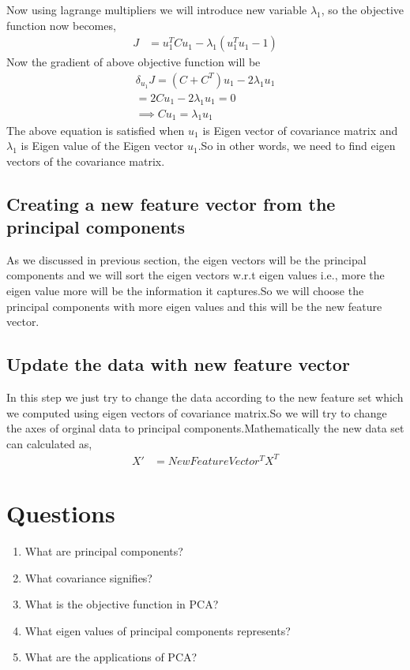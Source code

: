 \documentclass[journal,12pt,onecolumn]{IEEEtran}
\providecommand{\brak}[1]{\ensuremath{\left(#1\right)}}
\theoremstyle{remark}
\numberwithin{equation}{section}
\begin{document}
          Now using lagrange multipliers we will introduce  new variable $\lambda_1$, so the objective function now becomes,
           \begin{align}
		   J &=  u_1^TCu_1 - \lambda_1\brak{u_1^Tu_1 - 1}
           \end{align}
	  Now the gradient of above objective function will be 
	   \begin{align}
		   \delta_{u_1}J = \brak{C + C^T}u_1 - 2\lambda_1u_1\\
		                 = 2Cu_1 - 2\lambda_1 u_1 = 0\\
		   \implies Cu_1 = \lambda_1 u_1
           \end{align}
         The above equation is satisfied when $u_1$ is Eigen vector of covariance matrix and $\lambda_1$ is Eigen value of the Eigen vector $u_1$.So in other words, we need to find eigen vectors of the covariance matrix.
	      \subsection{Creating a new feature vector from the principal components}
	        As we discussed in previous section, the eigen vectors will be the principal components and we will sort the eigen vectors w.r.t eigen values i.e., more the eigen value more will be the information it captures.So we will choose the principal components with more eigen values and this will be the new feature vector.
             \subsection{Update the data with new feature vector}
	      In this step we just try to change the data according to the new feature set which we computed using eigen vectors of covariance matrix.So we will try to change the axes of orginal data to principal components.Mathematically the new data set can calculated as,
	       \begin{align}
		       X' &= NewFeatureVector^TX^T
	       \end{align}
	    \section{Questions}
	     \begin{enumerate}
	      \item What are principal components?
	      \item What covariance signifies?
	      \item What is the objective function in PCA?
	      \item What eigen values of principal components represents?
	      \item What are the applications of PCA?
             \end{enumerate}
\end{document}
